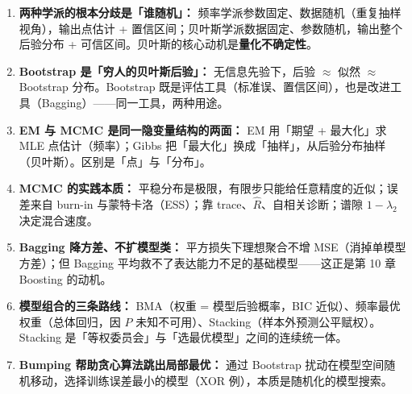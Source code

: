 \begin{enumerate}
    \item \textbf{两种学派的根本分歧是「谁随机」：} 频率学派参数固定、数据随机（重复抽样视角），输出点估计 + 置信区间；贝叶斯学派数据固定、参数随机，输出整个后验分布 + 可信区间。贝叶斯的核心动机是\textbf{量化不确定性}。
    \item \textbf{Bootstrap 是「穷人的贝叶斯后验」：} 无信息先验下，后验 $\approx$ 似然 $\approx$ Bootstrap 分布。Bootstrap 既是评估工具（标准误、置信区间），也是改进工具（Bagging）——同一工具，两种用途。
    \item \textbf{EM 与 MCMC 是同一隐变量结构的两面：} EM 用「期望 + 最大化」求 MLE 点估计（频率）；Gibbs 把「最大化」换成「抽样」，从后验分布抽样（贝叶斯）。区别是「点」与「分布」。
    \item \textbf{MCMC 的实践本质：} 平稳分布是极限，有限步只能给任意精度的近似；误差来自 burn-in 与蒙特卡洛（ESS）；靠 trace、$\hat{R}$、自相关诊断；谱隙 $1-\lambda_2$ 决定混合速度。
    \item \textbf{Bagging 降方差、不扩模型类：} 平方损失下理想聚合不增 MSE（消掉单模型方差）；但 Bagging 平均救不了表达能力不足的基础模型——这正是第 10 章 Boosting 的动机。
    \item \textbf{模型组合的三条路线：} BMA（权重 = 模型后验概率，BIC 近似）、频率最优权重（总体回归，因 $P$ 未知不可用）、Stacking（样本外预测公平赋权）。Stacking 是「等权委员会」与「选最优模型」之间的连续统一体。
    \item \textbf{Bumping 帮助贪心算法跳出局部最优：} 通过 Bootstrap 扰动在模型空间随机移动，选择训练误差最小的模型（XOR 例），本质是随机化的模型搜索。
\end{enumerate}